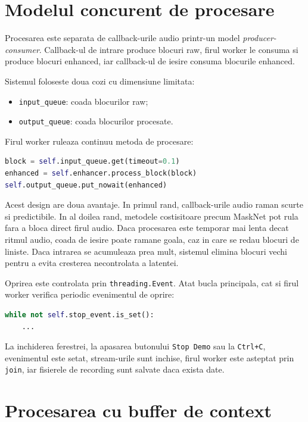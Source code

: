 \section{Modelul concurent de procesare}

Procesarea este separata de callback-urile audio printr-un model
\textit{producer-consumer}. Callback-ul de intrare produce blocuri raw, firul
worker le consuma si produce blocuri enhanced, iar callback-ul de iesire consuma
blocurile enhanced.

Sistemul foloseste doua cozi cu dimensiune limitata:

\begin{itemize}
    \item \texttt{input\_queue}: coada blocurilor raw;
    \item \texttt{output\_queue}: coada blocurilor procesate.
\end{itemize}

Firul worker ruleaza continuu metoda de procesare:

\begin{lstlisting}[language=Python]
block = self.input_queue.get(timeout=0.1)
enhanced = self.enhancer.process_block(block)
self.output_queue.put_nowait(enhanced)
\end{lstlisting}

Acest design are doua avantaje. In primul rand, callback-urile audio raman
scurte si predictibile. In al doilea rand, metodele costisitoare precum MaskNet
pot rula fara a bloca direct firul audio. Daca procesarea este temporar mai
lenta decat ritmul audio, coada de iesire poate ramane goala, caz in care se
redau blocuri de liniste. Daca intrarea se acumuleaza prea mult, sistemul
elimina blocuri vechi pentru a evita cresterea necontrolata a latentei.

Oprirea este controlata prin \texttt{threading.Event}. Atat bucla principala,
cat si firul worker verifica periodic evenimentul de oprire:

\begin{lstlisting}[language=Python]
while not self.stop_event.is_set():
    ...
\end{lstlisting}

La inchiderea ferestrei, la apasarea butonului \texttt{Stop Demo} sau la
\texttt{Ctrl+C}, evenimentul este setat, stream-urile sunt inchise, firul worker
este asteptat prin \texttt{join}, iar fisierele de recording sunt salvate daca
exista date.

\section{Procesarea cu buffer de context}

